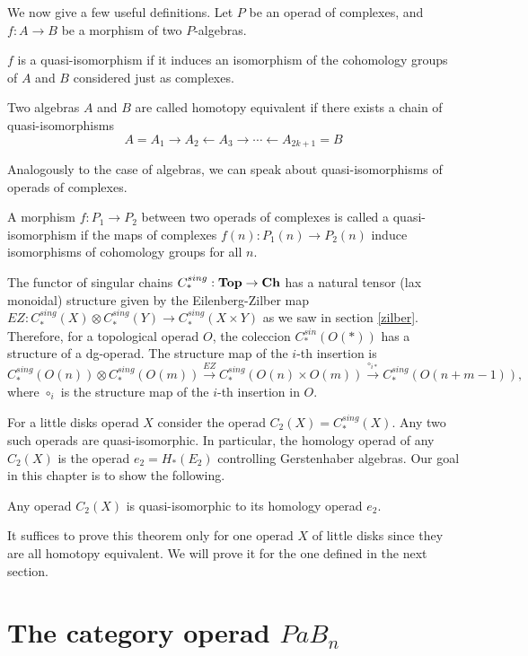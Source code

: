 \documentclass[TFM.tex]{subfiles}
\begin{document}
We now give a few useful definitions. Let $P$ be an operad of complexes, and $f : A→B$ be a morphism of two $P$-algebras.
\begin{defi}
$f$ is a quasi-isomorphism if it induces an isomorphism of the cohomology
groups of $A$ and $B$ considered just as complexes.
\end{defi}

\begin{defi}
Two algebras $A$ and $B$ are called homotopy equivalent if there exists a chain of quasi-isomorphisms
\[
A= A_1→A_2←A_3→\cdots←A_{2k+1} = B
\]
\end{defi}

Analogously to the case of algebras, we can speak about quasi-isomorphisms of operads
of complexes.

\begin{defi}
A morphism $f : P_1→P_2$ between two operads of complexes is called a
quasi-isomorphism if the maps of complexes $f(n) : P_1(n)→P_2(n)$ induce isomorphisms of
cohomology groups for all $n$.
\end{defi}


The functor of singular chains $C_*^{sing}:\mathrm{\mathbf{Top}}\to \mathrm{\mathbf{Ch}}$ has a natural tensor (lax monoidal) structure given by the Eilenberg-Zilber map $EZ:C_*^{sing}(X)\otimes C_*^{sing}(Y)\to C_*^{sing}(X\times Y)$ as we saw in section \ref{zilber}. Therefore, for a topological operad $O$, the coleccion $C_*^{sin}(O(*))$ has a structure of a dg-operad. The structure map of the $i$-th insertion is 
\[
C_*^{sing}(O(n))\otimes C_*^{sing}(O(m))\xrightarrow{EZ} C_*^{sing}(O(n)\times O(m))\xrightarrow{\circ_{i*}} C_*^{sing}(O(n+m-1)),
\]
where $\circ_i$ is the structure map of the $i$-th insertion in $O$. 

For a little disks operad $X$ consider the operad $C_2(X)=C_*^{sing}(X)$. Any two such operads are quasi-isomorphic. In particular, the homology operad of any $C_2(X)$ is the operad $e_2=H_*(E_2)$ controlling Gerstenhaber algebras. Our goal in this chapter is to show the following.

\begin{thm}
Any operad $C_2(X)$ is quasi-isomorphic to its homology operad $e_2$.
\end{thm}

It suffices to prove this theorem only for one operad $X$ of little disks since they are all homotopy equivalent. We will prove it for the one defined in the next section.

\section{The category operad $PaB_n$}\label{pab}
\end{document}
